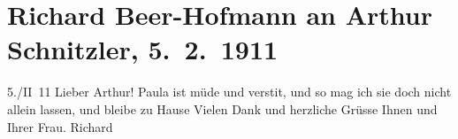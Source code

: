 

         
         \renewcommand{\erwaehntePersonen}{Personen: Paula Beer-Hofmann, Olga Schnitzler}
         \renewcommand{\erwaehnteOrte}{Orte: Wien}
         \renewcommand{\erwaehnteWerke}{}
               \section[Richard Beer-Hofmann an Arthur Schnitzler, 5. 2. 1911]{ Richard Beer-Hofmann an Arthur Schnitzler, 5. 2. 1911}\nopagebreak{}\rehead{ }\begin{ledgroupsized}[t]{13cm}\normalsize\beginnumbering \toendnotes[C]{\smallbreak\pagebreak[2]} 
\toendnotes[C]{\smallbreak}\pstart
           \raggedleft{}{\pb}5./II 11\pend
           \pstart{}Lieber Arthur!\pend\pstart
           Paula ist müde und versti{\geminationm}t, und so mag ich sie doch nicht allein lassen, und
               bleibe zu Hause\pend
           \pstart
           {\pb}Vielen Dank und herzliche Grüsse
               Ihnen und Ihrer Frau.\pend
           \pstart \spacefill\mbox{Richard}\pend{}
         
         \endnumbering{}\end{ledgroupsized}  \newcommand{\dateiname}{L02003}\newcommand{\titel}{Richard Beer-Hofmann an Arthur Schnitzler, 5. 2. 1911}\newcommand{\editorInnen}{Martin Anton Müller und Gerd-Hermann Susen}
      